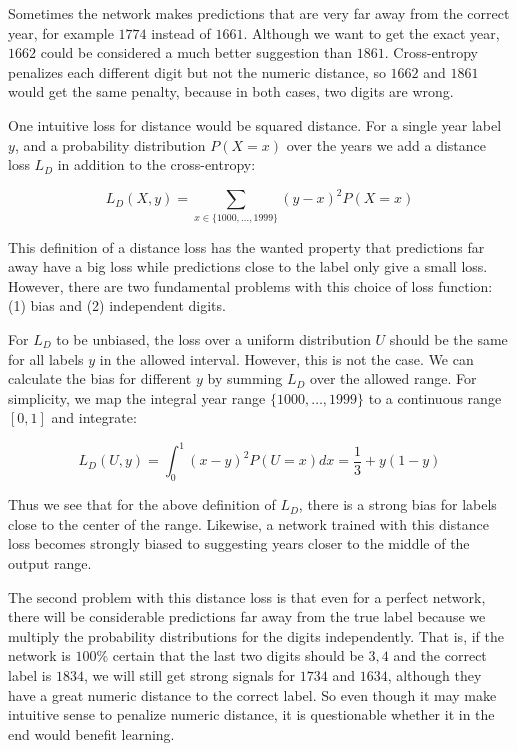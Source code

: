 Sometimes the network makes predictions that are very far away from the correct year, for example $1774$ instead of $1661$. Although we want to get the exact year, $1662$ could be considered a much better suggestion than $1861$. Cross-entropy penalizes each different digit but not the numeric distance, so $1662$ and $1861$ would get the same penalty, because in both cases, two digits are wrong.

One intuitive loss for distance would be squared distance. For a single year label $y$, and a probability distribution $P(X=x)$ over the years we add a distance loss $L_D$ in addition to the cross-entropy:

\[
L_D(X, y) = \sum_{x \in \{1000, \ldots, 1999\}} (y-x)^2 P(X=x)
\]

This definition of a distance loss has the wanted property that predictions far away have a big loss while predictions close to the label only give a small loss. However, there are two fundamental problems with this choice of loss function: (1) bias and (2) independent digits.

For $L_D$ to be unbiased, the loss over a uniform distribution $U$ should be the same for all labels $y$ in the allowed interval. However, this is not the case. We can calculate the bias for different $y$ by summing $L_D$ over the allowed range. For simplicity, we map the integral year range $\{ 1000, \ldots, 1999 \}$ to a continuous range $[0,1]$ and integrate:

\[
L_D(U, y) = \int_0^1 (x-y)^2 P(U=x) dx = \frac{1}{3} + y(1-y)
\]

Thus we see that for the above definition of $L_D$, there is a strong bias for labels close to the center of the range. Likewise, a network trained with this distance loss becomes strongly biased to suggesting years closer to the middle of the output range.


The second problem with this distance loss is that even for a perfect network, there will be considerable predictions far away from the true label because we multiply the probability distributions for the digits independently. That is, if the network is $100\%$ certain that the last two digits should be $3, 4$ and the correct label is $1834$, we will still get strong signals for $1734$ and $1634$, although they have a great numeric distance to the correct label.
So even though it may make intuitive sense to penalize numeric distance, it is questionable whether it in the end would benefit learning.

